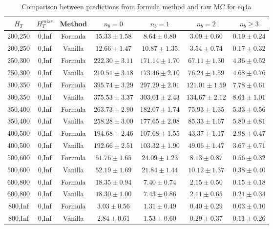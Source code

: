 \begin{longtable}{ | c | c | c | c | c | c | c | }
\caption{Comparison between predictions from formula method and raw MC for eq4a} \label{tab:formula-eq4a} \\    \hline 
$H_{T}$ & $H_{T}^{miss}$ & Method & $n_{b} = 0$ & $n_{b} = 1$ & $n_{b} = 2$ & $n_{b} \ge 3$ \\ \hline200,250 & 0,Inf & Formula  & $    15.33 \pm  1.58 $ & $     8.64 \pm  0.80 $ & $     3.09 \pm  0.60 $ & $     0.19 \pm  0.24 $  \\  
200,250 & 0,Inf & Vanilla  & $    12.66 \pm  1.47 $ & $    10.87 \pm  1.35 $ & $     3.54 \pm  0.74 $ & $     0.17 \pm  0.32 $  \\ \hline 
250,300 & 0,Inf & Formula  & $   222.30 \pm  3.11 $ & $   171.14 \pm  1.70 $ & $    67.11 \pm  1.30 $ & $     4.36 \pm  0.52 $  \\  
250,300 & 0,Inf & Vanilla  & $   210.51 \pm  3.18 $ & $   173.46 \pm  2.10 $ & $    76.24 \pm  1.59 $ & $     4.68 \pm  0.76 $  \\ \hline 
300,350 & 0,Inf & Formula  & $   395.74 \pm  3.29 $ & $   297.29 \pm  2.01 $ & $   121.01 \pm  1.59 $ & $     7.78 \pm  0.61 $  \\  
300,350 & 0,Inf & Vanilla  & $   375.53 \pm  3.37 $ & $   303.01 \pm  2.43 $ & $   134.67 \pm  2.12 $ & $     8.61 \pm  1.01 $  \\ \hline 
350,400 & 0,Inf & Formula  & $   263.73 \pm  2.90 $ & $   182.07 \pm  1.74 $ & $    75.93 \pm  1.35 $ & $     5.33 \pm  0.56 $  \\  
350,400 & 0,Inf & Vanilla  & $   258.28 \pm  3.00 $ & $   177.65 \pm  2.08 $ & $    85.33 \pm  1.67 $ & $     5.80 \pm  0.81 $  \\ \hline 
400,500 & 0,Inf & Formula  & $   194.68 \pm  2.46 $ & $   107.68 \pm  1.55 $ & $    43.37 \pm  1.17 $ & $     2.98 \pm  0.47 $  \\  
400,500 & 0,Inf & Vanilla  & $   192.66 \pm  2.51 $ & $   103.32 \pm  1.90 $ & $    49.06 \pm  1.47 $ & $     3.67 \pm  0.71 $  \\ \hline 
500,600 & 0,Inf & Formula  & $    51.76 \pm  1.65 $ & $    24.09 \pm  1.23 $ & $     8.13 \pm  0.87 $ & $     0.56 \pm  0.32 $  \\  
500,600 & 0,Inf & Vanilla  & $    52.19 \pm  1.69 $ & $    21.84 \pm  1.44 $ & $    10.12 \pm  1.37 $ & $     0.38 \pm  0.40 $  \\ \hline 
600,800 & 0,Inf & Formula  & $    18.35 \pm  0.94 $ & $     7.40 \pm  0.74 $ & $     2.15 \pm  0.50 $ & $     0.15 \pm  0.18 $  \\  
600,800 & 0,Inf & Vanilla  & $    18.30 \pm  1.00 $ & $     7.43 \pm  0.86 $ & $     2.11 \pm  0.65 $ & $     0.21 \pm  0.34 $  \\ \hline 
800,Inf & 0,Inf & Formula  & $     3.03 \pm  0.56 $ & $     1.31 \pm  0.49 $ & $     0.40 \pm  0.29 $ & $     0.03 \pm  0.10 $  \\  
800,Inf & 0,Inf & Vanilla  & $     2.84 \pm  0.61 $ & $     1.53 \pm  0.60 $ & $     0.29 \pm  0.37 $ & $     0.11 \pm  0.26 $  \\ \hline 
    \hline 
    \hline 
\end{longtable}

